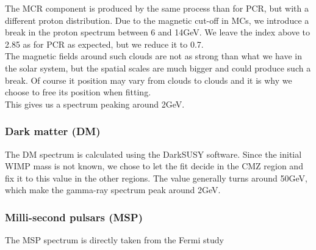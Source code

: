 The MCR component is produced by the same process than for PCR, but with a different proton distribution. Due to the magnetic cut-off in MCs, we introduce a break in the proton spectrum between 6 and 14GeV. We leave the index above to 2.85 as for PCR as expected, but we reduce it to 0.7.\\

The magnetic fields around such clouds are not as strong than what we have in the solar system, but the spatial scales are much bigger and could produce such a break. Of course it position may vary from clouds to clouds and it is why we choose to free its position when fitting.\\

This gives us a spectrum peaking around 2GeV.


\subsubsection{Dark matter (DM)}


The DM spectrum is calculated using the DarkSUSY software. Since the initial WIMP mass is not known, we chose to let the fit decide in the CMZ region and fix it to this value in the other regions. The value generally turns around 50GeV, which make the gamma-ray spectrum peak around 2GeV.


\subsubsection{Milli-second pulsars (MSP)}

The MSP spectrum is directly taken from the Fermi study 

